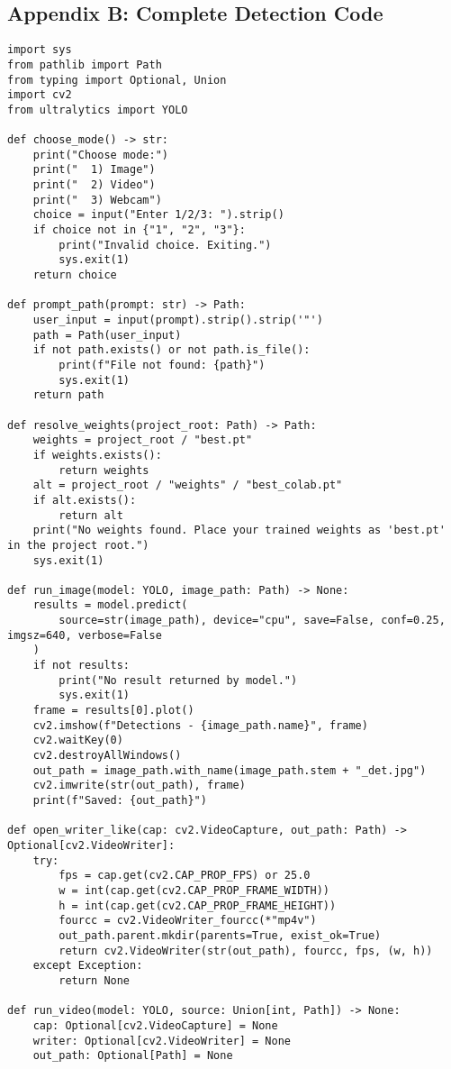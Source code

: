 \documentclass[12pt,a4paper]{article}
\begin{document}
\subsection{Appendix B: Complete Detection Code}
\begin{lstlisting}[caption=Complete Detection Implementation]
import sys
from pathlib import Path
from typing import Optional, Union
import cv2
from ultralytics import YOLO

def choose_mode() -> str:
    print("Choose mode:")
    print("  1) Image")
    print("  2) Video")
    print("  3) Webcam")
    choice = input("Enter 1/2/3: ").strip()
    if choice not in {"1", "2", "3"}:
        print("Invalid choice. Exiting.")
        sys.exit(1)
    return choice

def prompt_path(prompt: str) -> Path:
    user_input = input(prompt).strip().strip('"')
    path = Path(user_input)
    if not path.exists() or not path.is_file():
        print(f"File not found: {path}")
        sys.exit(1)
    return path

def resolve_weights(project_root: Path) -> Path:
    weights = project_root / "best.pt"
    if weights.exists():
        return weights
    alt = project_root / "weights" / "best_colab.pt"
    if alt.exists():
        return alt
    print("No weights found. Place your trained weights as 'best.pt' in the project root.")
    sys.exit(1)

def run_image(model: YOLO, image_path: Path) -> None:
    results = model.predict(
        source=str(image_path), device="cpu", save=False, conf=0.25, imgsz=640, verbose=False
    )
    if not results:
        print("No result returned by model.")
        sys.exit(1)
    frame = results[0].plot()
    cv2.imshow(f"Detections - {image_path.name}", frame)
    cv2.waitKey(0)
    cv2.destroyAllWindows()
    out_path = image_path.with_name(image_path.stem + "_det.jpg")
    cv2.imwrite(str(out_path), frame)
    print(f"Saved: {out_path}")

def open_writer_like(cap: cv2.VideoCapture, out_path: Path) -> Optional[cv2.VideoWriter]:
    try:
        fps = cap.get(cv2.CAP_PROP_FPS) or 25.0
        w = int(cap.get(cv2.CAP_PROP_FRAME_WIDTH))
        h = int(cap.get(cv2.CAP_PROP_FRAME_HEIGHT))
        fourcc = cv2.VideoWriter_fourcc(*"mp4v")
        out_path.parent.mkdir(parents=True, exist_ok=True)
        return cv2.VideoWriter(str(out_path), fourcc, fps, (w, h))
    except Exception:
        return None

def run_video(model: YOLO, source: Union[int, Path]) -> None:
    cap: Optional[cv2.VideoCapture] = None
    writer: Optional[cv2.VideoWriter] = None
    out_path: Optional[Path] = None


\end{lstlisting}
\end{document}
